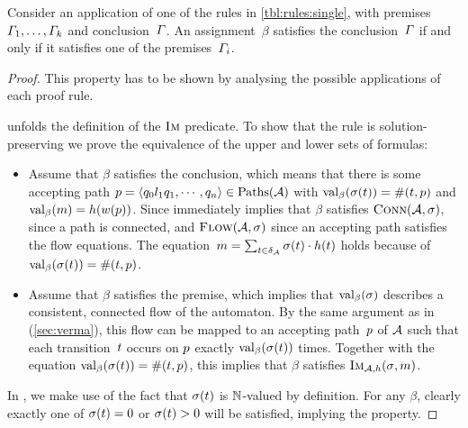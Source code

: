 \documentclass[acmsmall,review,anonymous,screen]{acmart}\settopmatter{printfolios=true,printccs=true,printacmref=true}
\theoremstyle{definition}
\begin{document}
\begin{lemma}\label{lma:single-correct}
  Consider an application of one of the rules in
  \cref{tbl:rules:single}, with
  premises~$\varGamma_1, \ldots, \varGamma_k$ and
  conclusion~$\varGamma$. An assignment~$\beta$ satisfies the
  conclusion~$\varGamma$ if and only if it satisfies one of the
  premises~$\varGamma_i$.
\end{lemma}

\begin{proof}
  This property has to be shown by analysing the possible applications
  of each proof rule.

  \Expand{} unfolds the definition of the $\operatorname{\textsc{Im}}$ predicate. To show
  that the rule is solution-preserving we prove the equivalence of the
  upper and lower sets of formulas:
  \begin{itemize}
  \item Assume that $\beta$ satisfies the conclusion, which means that
    there is some accepting path
    $p = \left\langle q_0 l_1 q_1 , \cdots , q_n\right\rangle \in \operatorname{Paths}(\mathcal{A})$ with
    $\operatorname{val}_\beta(\operatorname{\sigma}(t)) = \operatorname{\#}(t,
    p)$ and $\operatorname{val}_\beta(m) =
    h(w(p))$. Since immediately implies that $\beta$
    satisfies $\operatorname{\textsc{Conn}}(\mathcal{A}, \operatorname{\sigma})$, since a path is
    connected, and $\textsc{Flow}(\mathcal{A}, \operatorname{\sigma})$ since an accepting
    path satisfies the flow equations. The
    equation~$m = \sum_{t \in
      \delta_{\mathcal{A}}}\operatorname{\sigma}(t) \cdot
    h(t)$ holds because of
    $\operatorname{val}_\beta(\operatorname{\sigma}(t)) = \operatorname{\#}(t,
    p)$.
  \item Assume that $\beta$ satisfies the premise, which implies that
    $\operatorname{val}_\beta(\operatorname{\sigma})$ describes a consistent, connected flow of
    the automaton. By the same argument as in
    \cite{generate-parikh-image} (\cref{sec:verma}), this flow
    can be mapped to an accepting path~$p$ of $\mathcal{A}$ such
    that each transition~$t$ occurs on $p$ exactly
    $\operatorname{val}_\beta(\operatorname{\sigma}(t))$ times. Together with the equation
    $\operatorname{val}_\beta(\operatorname{\sigma}(t)) = \operatorname{\#}(t,
    p)$, this implies that $\beta$ satisfies $\operatorname{\textsc{Im}}_{\mathcal{A}, h}(\operatorname{\sigma}, m)$.
  \end{itemize}

  In \Split{}, we make use of the fact that $\operatorname{\sigma}(t)$ is
  $\mathbb{N}$-valued by definition. For any $\beta$, clearly exactly
  one of $\operatorname{\sigma}(t) = 0$ or $\operatorname{\sigma}(t) > 0$ will
  be satisfied, implying the property.


\end{proof}
\end{document}
